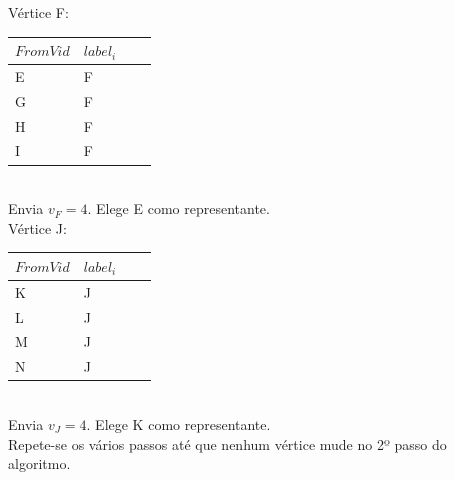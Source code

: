 \documentclass[a4paper,10pt]{report}
\begin{document}
Vértice F:
  \begin{tabular}{| l | l | l | l |}
  \hline
  $From Vid$ & $label_i$\\ \hline
  E & F \\ \hline
  G & F \\ \hline
  H & F \\ \hline
  I & F \\ \hline
  \end{tabular}  
\\[0.25cm]
  Envia $v_F = 4$. Elege E como representante.
  \\[0.25cm]
Vértice J:
  \begin{tabular}{| l | l | l | l |}
  \hline
  $From Vid$ & $label_i$\\ \hline
  K & J \\ \hline
  L & J \\ \hline
  M & J \\ \hline
  N & J \\ \hline
  \end{tabular}  
\\[0.25cm]
  Envia $v_J = 4$. Elege K como representante.
\\[0.25cm]
  Repete-se os vários passos até que nenhum vértice mude no 2º passo do 
algoritmo.

  
\end{document}
